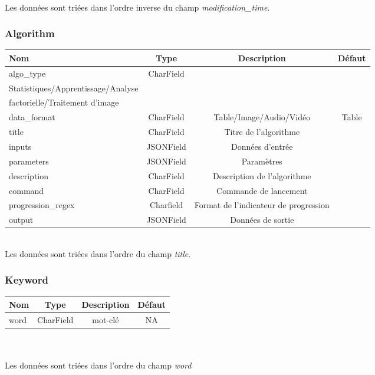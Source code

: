\documentclass[a4paper]{report}
\begin{document}
~\\
Les données sont triées dans l'ordre inverse du champ \emph{modification\_time}.

\subsubsection{Algorithm}
\begin{adjustbox}{center}\begin{tabular}{|l|c|c|c|}
		\hline
		\textbf{Nom} & \textbf{Type} & \textbf{Description} & \textbf{Défaut}\\
		\hline
		algo\_type  & CharField & \begin{minipage}{6cm}\centering Régression/Classification/\\Statistiques/Apprentissage/Analyse\\ factorielle/Traitement d'image\end{minipage} & \\
		data\_format & CharField & Table/Image/Audio/Vidéo & Table \\
		title & CharField & Titre de l'algorithme & \\
		inputs & JSONField & Données d'entrée &  \\
		parameters & JSONField & Paramètres & \\
		description & CharField & Description de l'algorithme & \\
		command & CharField & Commande de lancement & \\
		progression\_regex & Charfield & Format de l'indicateur de progression &  \\
		output & JSONField & Données de sortie & \\
		\hline
\end{tabular}\end{adjustbox}
~\\
Les données sont triées dans l'ordre du champ \emph{title}.

\subsubsection{Keyword}
\begin{tabular}{|l|c|c|c|}
	\hline
	\textbf{Nom} & \textbf{Type} & \textbf{Description} & \textbf{Défaut}\\
	\hline
	word & CharField & mot-clé & NA \\
	\hline
\end{tabular}
~\\~\\
Les données sont triées dans l'ordre du champ \emph{word}
\end{document}
